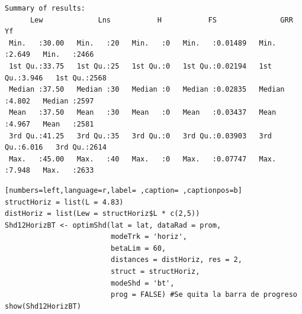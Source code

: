 \begin{verbatim}
Summary of results:
      Lew             Lns           H           FS               GRR              Yf      
 Min.   :30.00   Min.   :20   Min.   :0   Min.   :0.01489   Min.   :2.649   Min.   :2466  
 1st Qu.:33.75   1st Qu.:25   1st Qu.:0   1st Qu.:0.02194   1st Qu.:3.946   1st Qu.:2568  
 Median :37.50   Median :30   Median :0   Median :0.02835   Median :4.802   Median :2597  
 Mean   :37.50   Mean   :30   Mean   :0   Mean   :0.03437   Mean   :4.967   Mean   :2581  
 3rd Qu.:41.25   3rd Qu.:35   3rd Qu.:0   3rd Qu.:0.03903   3rd Qu.:6.016   3rd Qu.:2614  
 Max.   :45.00   Max.   :40   Max.   :0   Max.   :0.07747   Max.   :7.948   Max.   :2633
\end{verbatim}

\begin{lstlisting}[numbers=left,language=r,label= ,caption= ,captionpos=b]
structHoriz = list(L = 4.83)
distHoriz = list(Lew = structHoriz$L * c(2,5))
Shd12HorizBT <- optimShd(lat = lat, dataRad = prom,
                         modeTrk = 'horiz',
                         betaLim = 60,
                         distances = distHoriz, res = 2,
                         struct = structHoriz,
                         modeShd = 'bt',
                         prog = FALSE) #Se quita la barra de progreso
show(Shd12HorizBT)
\end{lstlisting}

